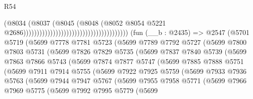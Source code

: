 \begin{lexlean}{R54}
\begin{coremodule}
                                                                        (@8034
                                                                          (@8037
                                                                            (@8045
                                                                              (@8048
                                                                                (@8052
                                                                                  @8054
                                                                                  @5221
                                                                                  @2686)))))))))))))))))))))))))))))))))))))))
    (fun (__b : @2435) =>
    @2547
      (@5701
        @5719
        (@5699
          @7778
          @7781
          @5723
          (@5699
            @7789
            @7792
            @5727
            (@5699
              @7800
              @7803
              @5731
              (@5699
                @7826
                @7829
                @5735
                (@5699
                  @7837
                  @7840
                  @5739
                  (@5699
                    @7863
                    @7866
                    @5743
                    (@5699
                      @7874
                      @7877
                      @5747
                      (@5699
                        @7885
                        @7888
                        @5751
                        (@5699
                          @7911
                          @7914
                          @5755
                          (@5699
                            @7922
                            @7925
                            @5759
                            (@5699
                              @7933
                              @7936
                              @5763
                              (@5699
                                @7944
                                @7947
                                @5767
                                (@5699
                                  @7955
                                  @7958
                                  @5771
                                  (@5699
                                    @7966
                                    @7969
                                    @5775
                                    (@5699
                                      @7992
                                      @7995
                                      @5779
                                      (@5699

\end{coremodule}
\end{lexlean}
